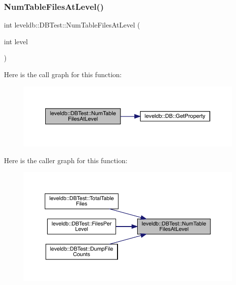 \subsubsection{\texorpdfstring{NumTableFilesAtLevel()}{NumTableFilesAtLevel()}}
{\footnotesize\ttfamily int leveldb\+::\+D\+B\+Test\+::\+Num\+Table\+Files\+At\+Level (\begin{DoxyParamCaption}\item[{int}]{level }\end{DoxyParamCaption})\hspace{0.3cm}{\ttfamily [inline]}}

Here is the call graph for this function\+:
\nopagebreak
\begin{figure}[H]
\begin{center}
\leavevmode
\includegraphics[width=350pt]{classleveldb_1_1_d_b_test_aa7c845810f6d57b0655eda370e8de33f_cgraph}
\end{center}
\end{figure}
Here is the caller graph for this function\+:
\nopagebreak
\begin{figure}[H]
\begin{center}
\leavevmode
\includegraphics[width=350pt]{classleveldb_1_1_d_b_test_aa7c845810f6d57b0655eda370e8de33f_icgraph}
\end{center}
\end{figure}
\mbox{\label{classleveldb_1_1_d_b_test_a5ec1a1d5ecc1744f325159eb81e46514}} 
